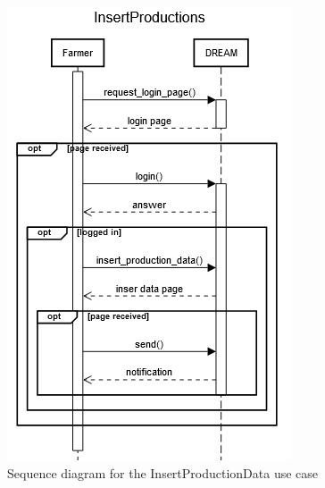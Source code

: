 \documentclass{article}
\begin{document}
\begin{figure}[H]
    \centering
    \includegraphics[scale=0.75]{sequence_diagrams/InsertProductions}
    \caption{Sequence diagram for the InsertProductionData use case}
\end{figure}

\end{document}
